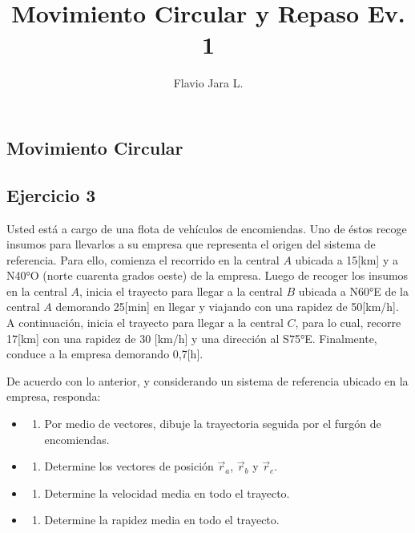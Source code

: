 \documentclass[
  letterpaper,
  DIV=11,
  numbers=noendperiod]{scrartcl}
\title{Movimiento Circular y Repaso Ev. 1}
\author{Flavio Jara L.}
\date{}
\providecommand{\tightlist}{%
  \setlength{\itemsep}{0pt}\setlength{\parskip}{0pt}}\usepackage{longtable,booktabs,array}
\begin{document}
\maketitle


\subsection{Movimiento Circular}\label{movimiento-circular}

\subsection{Ejercicio 3}\label{ejercicio-3}

Usted está a cargo de una flota de vehículos de encomiendas. Uno de
éstos recoge insumos para llevarlos a su empresa que representa el
origen del sistema de referencia. Para ello, comienza el recorrido en la
central \(A\) ubicada a 15{[}km{]} y a N40°O (norte cuarenta grados
oeste) de la empresa. Luego de recoger los insumos en la central \(A\),
inicia el trayecto para llegar a la central \(B\) ubicada a N60°E de la
central \(A\) demorando 25{[}min{]} en llegar y viajando con una rapidez
de 50{[}km/h{]}. A continuación, inicia el trayecto para llegar a la
central \(C\), para lo cual, recorre 17{[}km{]} con una rapidez de 30
{[}km/h{]} y una dirección al S75°E. Finalmente, conduce a la empresa
demorando 0,7{[}h{]}.

De acuerdo con lo anterior, y considerando un sistema de referencia
ubicado en la empresa, responda:

\begin{itemize}
\tightlist
\item
  \begin{enumerate}
  \def\labelenumi{\alph{enumi})}
  \tightlist
  \item
    Por medio de vectores, dibuje la trayectoria seguida por el furgón
    de encomiendas.
  \end{enumerate}
\item
  \begin{enumerate}
  \def\labelenumi{\alph{enumi})}
  \setcounter{enumi}{1}
  \tightlist
  \item
    Determine los vectores de posición \(\vec{r}_a\), \(\vec{r}_b\) y
    \(\vec{r}_c\).
  \end{enumerate}
\item
  \begin{enumerate}
  \def\labelenumi{\alph{enumi})}
  \setcounter{enumi}{2}
  \tightlist
  \item
    Determine la velocidad media en todo el trayecto.
  \end{enumerate}
\item
  \begin{enumerate}
  \def\labelenumi{\alph{enumi})}
  \setcounter{enumi}{3}
  \tightlist
  \item
    Determine la rapidez media en todo el trayecto.
  \end{enumerate}
\end{itemize}
\end{document}
